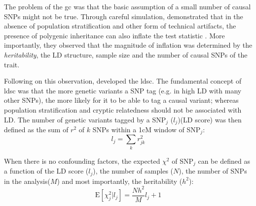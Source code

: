 	The problem of the \gls{gc} was that the basic assumption of a small number of causal \glspl{SNP} might not be true. 
	Through careful simulation, \citet{Yang2011b} demonstrated that in the absence of population stratification and other form of technical artifacts, the presence of polygenic inheritance can also inflate the test statistic \citep{Yang2011b}.
	More importantly, they observed that the magnitude of inflation was determined by the \emph{heritability}, the \gls{LD} structure, sample size and the number of causal \glspl{SNP} of the trait.

	Following on this observation, \citet{Bulik-Sullivan2015} developed the \gls{ldsc}.
	The fundamental concept of \gls{ldsc} was that the more genetic variants a \gls{SNP} tag (e.g. in high \gls{LD} with many other \glspl{SNP}), the more likely for it to be able to tag a causal variant; 
	whereas population stratification and cryptic relatedness should not be associated with \gls{LD}. 
	The number of genetic variants tagged by a \gls{SNP}$_j$ ($l_j$)(\gls{LD} score) was then defined as the sum of $r^2$ of $k$ \glspl{SNP} within a 1cM window of \gls{SNP}$_j$:
	\begin{equation}
	l_j = \sum_kr^2_{jk}
	\label{eq:ldScore}
	\end{equation}
	
	When there is no confounding factors, the expected $\chi^2$ of \gls{SNP}$_j$ can be defined as a function of the \gls{LD} score ($l_j$), the number of samples ($N$), the number of \glspl{SNP} in the analysis($M$) and most importantly, the heritability ($h^2$):
	\begin{equation}
	\mathrm{E}[\chi^2_j | l_j] = \frac{Nh^2}{M}l_j+1
	\label{eq:fixedLDSC}
	\end{equation}

